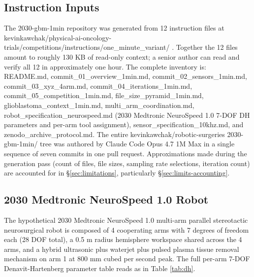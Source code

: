 
\subsection{Instruction Inputs}
\label{sec:methods-inputs}

The 2030-gbm-1min repository was generated from 12 instruction files at
kevinkawchak/physical-ai-oncology-trials/competitions/instructions/one_minute_variant/
\cite{one-minute-variant-instructions}. Together the 12 files amount
to roughly 130 KB of read-only context; a senior author can read and
verify all 12 in approximately one hour. The complete inventory is:
README.md, commit_01_overview_1min.md, commit_02_sensors_1min.md,
commit_03_xyz_4arm.md, commit_04_iterations_1min.md, 
commit_05_competition_1min.md, file_size_pyramid_1min.md, glioblastoma_context_1min.md, multi_arm_coordination.md, robot_specification_neurospeed.md
(2030 Medtronic NeuroSpeed 1.0 7-DOF DH parameters and per-arm tool
assignment), sensor_specification_10khz.md, and zenodo_archive_protocol.md. The entire kevinkawchak/robotic-surgeries
2030-gbm-1min/ tree was authored by Claude Code Opus 4.7 1M Max
\cite{claude-opus-47, claude-code} in a single sequence of seven
commits in one pull request. Approximations made during the
generation pass (count of files, file sizes, sampling rate
selections, iteration count) are accounted for in
\S\ref{sec:limitations}, particularly
\S\ref{sec:limits-accounting}.

\subsection{2030 Medtronic NeuroSpeed 1.0 Robot}
\label{sec:methods-robot}

The hypothetical 2030 Medtronic NeuroSpeed 1.0 multi-arm parallel
stereotactic neurosurgical robot is composed of 4 cooperating arms
with 7 degrees of freedom each (28 DOF total), a 0.5 m radius
hemisphere workspace shared across the 4 arms, and a hybrid
ultrasonic plus waterjet plus pulsed plasma tissue removal mechanism
on arm 1 at 800 mm cubed per second peak. The full per-arm 7-DOF
Denavit-Hartenberg parameter table reads as in
Table \ref{tab:dh}.


